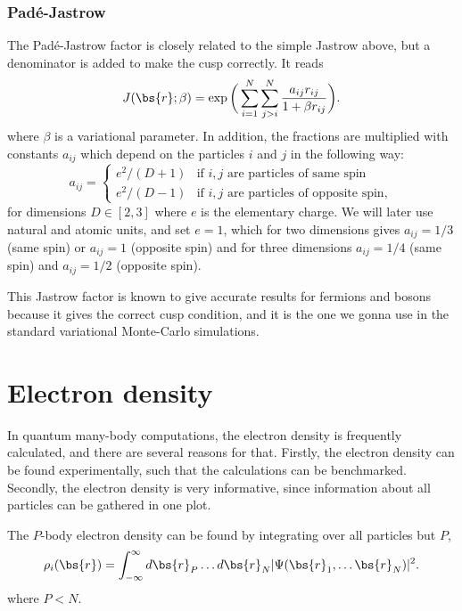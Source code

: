 \subsubsection{Padé-Jastrow}
The Padé-Jastrow factor is closely related to the simple Jastrow above, but a denominator is added to make the cusp correctly. It reads
\begin{equation}
J(\bs{r};\beta) = \exp\bigg(\sum_{i=1}^N\sum_{j>i}^N\frac{a_{ij}r_{ij}}{1+\beta r_{ij}}\bigg).
\label{eq:PadeJastrow}
\end{equation}
where $\beta$ is a variational parameter. In addition, the fractions are multiplied with constants $a_{ij}$ which depend on the particles $i$ and $j$ in the following way:
\begin{equation}
\label{eq:ajastrow}
a_{ij}=
\begin{cases} 
e^2/(D+1) & \text{if $i,j$ are particles of same spin} \\
e^2/(D-1) & \text{if $i,j$ are particles of opposite spin},
\end{cases}
\end{equation}
for dimensions $D\in[2,3]$ where $e$ is the elementary charge. We will later use natural and atomic units, and set $e=1$, which for two dimensions gives $a_{ij}=1/3$ (same spin) or $a_{ij}=1$ (opposite spin) and for three dimensions $a_{ij}=1/4$ (same spin) and $a_{ij}=1/2$ (opposite spin). \cite{hogberget_quantum_2013,mariadason_quantum_2018}

This Jastrow factor is known to give accurate results for fermions and bosons because it gives the correct cusp condition, and it is the one we gonna use in the standard variational Monte-Carlo simulations.

\section{Electron density}
In quantum many-body computations, the electron density is frequently calculated, and there are several reasons for that. Firstly, the electron density can be found experimentally, such that the calculations can be benchmarked. Secondly, the electron density is very informative, since information about all particles can be gathered in one plot.

The $P$-body electron density can be found by integrating over all particles but $P$, 
\begin{equation}
\label{eq:electron_density}
\rho_i(\bs{r})=\int_{-\infty}^{\infty}d\bs{r}_P\hdots d\bs{r}_N |\Psi(\bs{r}_1,\hdots \bs{r}_N)|^2.
\end{equation}
where $P<N$.

